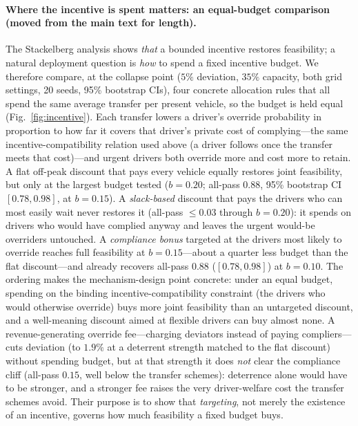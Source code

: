 \documentclass[12pt]{article}
\newcommand{\figref}[1]{Fig.~\ref{#1}}
\begin{document}
\paragraph{Where the incentive is spent matters: an equal-budget comparison (moved from the main text for length).} The Stackelberg analysis shows \emph{that} a bounded incentive restores feasibility; a natural deployment question is \emph{how} to spend a fixed incentive budget. We therefore compare, at the collapse point ($5\%$ deviation, $35\%$ capacity, both grid settings, 20 seeds, 95\% bootstrap CIs), four concrete allocation rules that all spend the same average transfer per present vehicle, so the budget is held equal (\figref{fig:incentive}). Each transfer lowers a driver's override probability in proportion to how far it covers that driver's private cost of complying---the same incentive-compatibility relation used above (a driver follows once the transfer meets that cost)---and urgent drivers both override more and cost more to retain. A flat off-peak discount that pays every vehicle equally restores joint feasibility, but only at the largest budget tested ($b=0.20$; all-pass $0.88$, 95\% bootstrap CI $[0.78,0.98]$, at $b=0.15$). A \emph{slack-based} discount that pays the drivers who can most easily wait never restores it (all-pass $\le 0.03$ through $b=0.20$): it spends on drivers who would have complied anyway and leaves the urgent would-be overriders untouched. A \emph{compliance bonus} targeted at the drivers most likely to override reaches full feasibility at $b=0.15$---about a quarter less budget than the flat discount---and already recovers all-pass $0.88$ ($[0.78,0.98]$) at $b=0.10$. The ordering makes the mechanism-design point concrete: under an equal budget, spending on the binding incentive-compatibility constraint (the drivers who would otherwise override) buys more joint feasibility than an untargeted discount, and a well-meaning discount aimed at flexible drivers can buy almost none. A revenue-generating override fee---charging deviators instead of paying compliers---cuts deviation (to $1.9\%$ at a deterrent strength matched to the flat discount) without spending budget, but at that strength it does \emph{not} clear the compliance cliff (all-pass $0.15$, well below the transfer schemes): deterrence alone would have to be stronger, and a stronger fee raises the very driver-welfare cost the transfer schemes avoid. Their purpose is to show that \emph{targeting}, not merely the existence of an incentive, governs how much feasibility a fixed budget buys.
\end{document}
